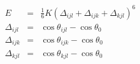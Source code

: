 \documentclass[12pt]{article}
\begin{document}
\begin{eqnarray*}
   E & = &\frac{1}{6} K \left(\Delta_{ijl} + \Delta_{ijk} + \Delta_{kjl} \right)^6 \\
   \Delta_{ijl} & = & \cos{\theta_{ijl} - \cos{\theta_0}} \\
   \Delta_{ijk} & = & \cos{\theta_{ijk} - \cos{\theta_0}} \\
   \Delta_{kjl} & = & \cos{\theta_{kjl} - \cos{\theta_0}}
\end{eqnarray*}
\end{document}
